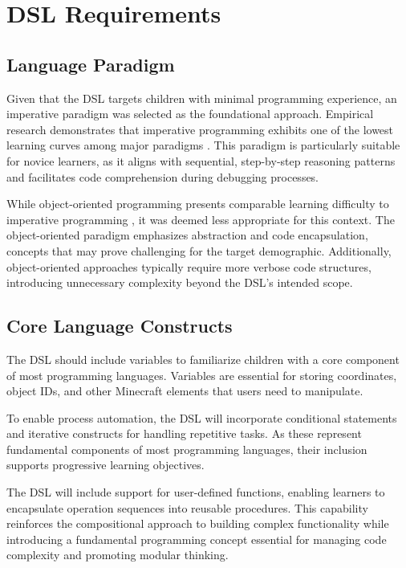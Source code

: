 \section{DSL Requirements}

\subsection{Language Paradigm}

Given that the DSL targets children with minimal programming experience, an imperative paradigm was selected as the foundational approach. 
Empirical research demonstrates that imperative programming exhibits one of the lowest learning curves among major paradigms \cite{ugwumba_programming_2026}. 
This paradigm is particularly suitable for novice learners, as it aligns with sequential, step-by-step reasoning patterns and facilitates code comprehension during debugging processes.

While object-oriented programming presents comparable learning difficulty to imperative programming \cite{ugwumba_programming_2026}, it was deemed less appropriate for this context. 
The object-oriented paradigm emphasizes abstraction and code encapsulation, concepts that may prove challenging for the target demographic. 
Additionally, object-oriented approaches typically require more verbose code structures, introducing unnecessary complexity beyond the DSL's intended scope.

\subsection{Core Language Constructs}

The DSL should include variables to familiarize children with a core component of most programming languages. 
Variables are essential for storing coordinates, object IDs, and other Minecraft elements that users need to manipulate.

To enable process automation, the DSL will incorporate conditional statements and iterative constructs for handling repetitive tasks. 
As these represent fundamental components of most programming languages, their inclusion supports progressive learning objectives.

The DSL will include support for user-defined functions, enabling learners to encapsulate operation sequences into reusable procedures. 
This capability reinforces the compositional approach to building complex functionality while introducing a fundamental programming concept essential for managing code complexity and promoting modular thinking.


